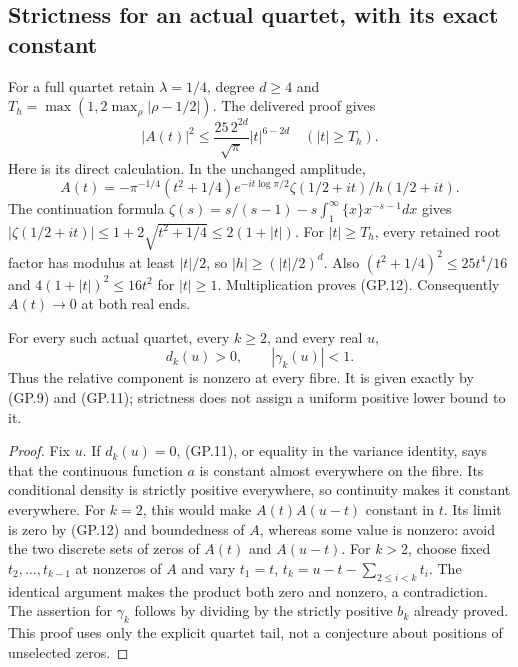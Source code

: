 \subsection{Strictness for an actual quartet, with its exact constant}
For a full quartet retain $\lambda=1/4$, degree $d\geq4$ and
$T_h=\max(1,2\max_\rho|\rho-1/2|)$. The delivered proof gives
\begin{equation}
 |A(t)|^2\leq \frac{25\,2^{2d}}{\sqrt\pi}|t|^{6-2d}
                  \quad (|t|\geq T_h).
 \tag{GP.12}
\end{equation}
Here is its direct calculation. In the unchanged amplitude,
\[
 A(t)=-\pi^{-1/4}(t^2+1/4)e^{-it\log\pi/2}
                    \zeta(1/2+it)/h(1/2+it).
\]
The continuation formula
$\zeta(s)=s/(s-1)-s\int_1^\infty\{x\}x^{-s-1}dx$
gives $|\zeta(1/2+it)|\leq1+2\sqrt{t^2+1/4}
\leq2(1+|t|)$. For $|t|\geq T_h$, every retained root factor has
modulus at least $|t|/2$, so $|h|\geq(|t|/2)^d$.
Also $(t^2+1/4)^2\leq25t^4/16$ and
$4(1+|t|)^2\leq16t^2$ for $|t|\geq1$. Multiplication proves
(GP.12). Consequently $A(t)\to0$ at both real ends.

\begin{theorem}
For every such actual quartet, every $k\geq2$, and every real $u$,
\begin{equation}
 d_k(u)>0,\qquad |\gamma_k(u)|<1.
 \tag{GP.13}
\end{equation}
Thus the relative component is nonzero at every fibre. It is given
exactly by (GP.9) and (GP.11); strictness does not assign a uniform
positive lower bound to it.
\end{theorem}
\begin{proof}
Fix $u$. If $d_k(u)=0$, (GP.11), or equality in the variance
identity, says that the continuous function $a$ is constant almost
everywhere on the fibre. Its conditional density is strictly positive
everywhere, so continuity makes it constant everywhere. For $k=2$,
this would make $A(t)A(u-t)$ constant in $t$. Its limit is zero
by (GP.12) and boundedness of $A$, whereas some value is nonzero:
avoid the two discrete sets of zeros of $A(t)$ and $A(u-t)$.
For $k>2$, choose fixed $t_2,\ldots,t_{k-1}$ at nonzeros of $A$
and vary $t_1=t$, $t_k=u-t-\sum_{2\leq i<k}t_i$. The identical
argument makes the product both zero and nonzero, a contradiction.
The assertion for $\gamma_k$ follows by dividing by the strictly
positive $b_k$ already proved. This proof uses only the explicit
quartet tail, not a conjecture about positions of unselected zeros.
\end{proof}

